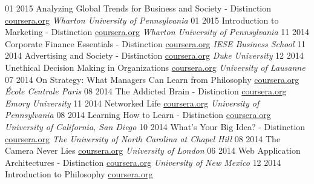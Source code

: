\documentclass[]{friggeri-cv}
\begin{document}
\begin{entrylist}
\entry
    {01 2015}
    {Analyzing Global Trends for Business and Society - Distinction}
    {\href{https://www.coursera.org/maestro/api/certificate/get_certificate?course_id=973232}{coursera.org}}
    {\emph{Wharton University of Pennsylvania}}
\entry
    {01 2015}
    {Introduction to Marketing - Distinction}
    {\href{https://www.coursera.org/maestro/api/certificate/get_certificate?course_id=973325}{coursera.org}}
    {\emph{Wharton University of Pennsylvania}}  
\entry
    {11 2014}
    {Corporate Finance Essentials - Distinction}
    {\href{https://www.coursera.org/maestro/api/certificate/get_certificate?course_id=972797}{coursera.org}}
    {\emph{IESE Business School}}
\entry
    {11 2014}
    {Advertising and Society - Distinction}
    {\href{https://www.coursera.org/maestro/api/certificate/get_certificate?course_id=973223}{coursera.org}}
    {\emph{Duke University}}
\entry
    {12 2014}
    {Unethical Decision Making in Organizations}
    {\href{https://www.coursera.org/maestro/api/certificate/get_certificate?course_id=971715}{coursera.org}}
    {\emph{University of Lausanne}}
\entry
    {07 2014}
    {On Strategy: What Managers Can Learn from Philosophy}
    {\href{https://www.coursera.org/maestro/api/certificate/get_certificate?course_id=971630}{coursera.org}}
    {\emph{École Centrale Paris}}
\entry
    {08 2014}
    {The Addicted Brain - Distinction}
    {\href{https://www.coursera.org/maestro/api/certificate/get_certificate?course_id=972253}{coursera.org}}
    {\emph{Emory University}}
\entry
    {11 2014}
    {Networked Life}
    {\href{https://www.coursera.org/maestro/api/certificate/get_certificate?course_id=973226}{coursera.org}}
    {\emph{University of Pennsylvania}}
\entry
    {08 2014}
    {Learning How to Learn - Distinction}
    {\href{http://coursera.org}{coursera.org}}
    {\emph{University of California, San Diego}}
\entry
    {10 2014}
    {What's Your Big Idea? - Distinction}
    {\href{http://coursera.org}{coursera.org}}
    {\emph{The University of North Carolina at Chapel Hill}}
\entry
    {08 2014}
    {The Camera Never Lies}
    {\href{http://coursera.org}{coursera.org}}
    {\emph{University of London}}
 \entry
    {06 2014}
    {Web Application Architectures - Distinction}
    {\href{https://www.coursera.org/maestro/api/certificate/get_certificate?course_id=971382}{coursera.org}}
    {\emph{University of New Mexico}}
\entry
    {12 2014}
    {Introduction to Philosophy}
    {\href{https://www.coursera.org/maestro/api/certificate/get_certificate?course_id=972834}{coursera.org}}

\end{entrylist}
\end{document}
